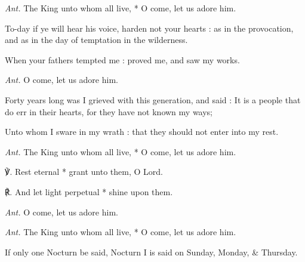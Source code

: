 \textit{Ant.} The King unto whom all live, * O come, let us adore him.\par
{}To-day if ye will hear his voice, harden not your hearts : as in the provocation, and as in the day of temptation in the wilderness.\par
{}When your fathers tempted me : proved me, and saw my works.\par
\textit{Ant.} O come, let us adore him.\par
{}Forty years long was I grieved with this generation, and said : It is a people that do err in their hearts, for they have not known my ways;\par
{}Unto whom I sware in my wrath : that they should not enter into my rest.\par
\textit{Ant.} The King unto whom all live, * O come, let us adore him.\par
℣. Rest eternal * grant unto them, O Lord.\par
℟. And let light perpetual * shine upon them.\par
\textit{Ant.} O come, let us adore him.\par\noindent
\textit{Ant.} The King unto whom all live, * O come, let us adore him.\par

\vspace{-1ex}

\par
\begin{rubric}
    {If only one Nocturn be said, Nocturn I is said on Sunday, Monday, \& Thursday.}
\end{rubric}

\vspace{-1ex}

